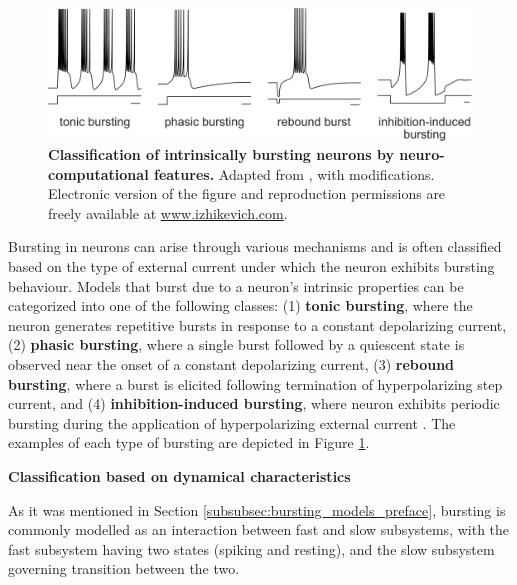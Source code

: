 \documentclass[../main.tex]{subfiles}
\begin{document}
\begin{figure}[!t]
    \centering
    \includegraphics[width=0.85\linewidth]{../img/modeling_r5/examples/classification_of_intrinsic_bursters.png}
    \caption[Classification of intrinsically bursting neurons by neuro-computational features]{
        \textbf{Classification of intrinsically bursting neurons by neuro-computational features.}
        Adapted from \parencite{izhikevichDynamicalSystemsNeuroscience2006}, with modifications.
        Electronic version of the figure and reproduction permissions
        are freely available at \url{www.izhikevich.com}.
    }
    \label{fig:classification_intrin_burst}
\end{figure}

Bursting in neurons can arise through various mechanisms and is often classified based on the type of external current under which the neuron exhibits bursting behaviour. Models that burst due to a neuron's intrinsic properties can be categorized into one of the following classes: (1) \textbf{tonic bursting}, where the neuron generates repetitive bursts in response to a constant depolarizing current, (2) \textbf{phasic bursting}, where a single burst followed by a quiescent state is observed near the onset of a constant depolarizing current, (3) \textbf{rebound bursting}, where a burst is elicited following termination of hyperpolarizing step current, and (4) \textbf{inhibition-induced bursting}, where neuron exhibits periodic bursting during the application of hyperpolarizing external current \parencite{izhikevichDynamicalSystemsNeuroscience2006,izhikevichWhichModelUse2004}. The examples of each type of bursting are depicted in Figure \ref{fig:classification_intrin_burst}.

\vspace*{0.3cm}
\noindent\textbf{Classification based on dynamical characteristics}

As it was mentioned in Section \ref{subsubsec:bursting_models_preface}, bursting is commonly modelled as an interaction between fast and slow subsystems, with the fast subsystem having two states (spiking and resting), and the slow subsystem governing transition between the two.
\end{document}
